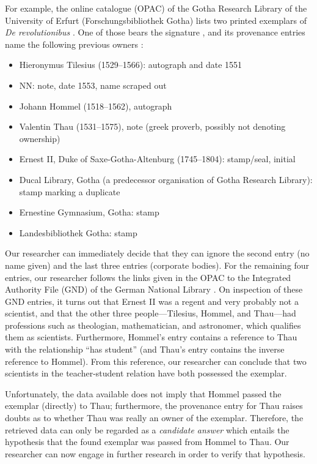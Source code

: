 For example, the online catalogue (OPAC) of the Gotha Research Library of the University of Erfurt (Forschungsbibliothek Gotha) lists two printed exemplars
of \emph{De revolutionibus} \autocite{OPACDeRev}.
One of those bears the signature , and its provenance entries name the following previous owners  \autocite{OPACDeRevPPN}:
%
\begin{itemize}
  \item
    Hieronymus Tilesius (1529–1566): autograph and date 1551
  \item
    NN: note, date 1553, name scraped out
  \item
    Johann Hommel (1518–1562), autograph
  \item
    Valentin Thau (1531–1575), note (greek proverb, possibly not denoting ownership)
  \item
    Ernest II, Duke of Saxe-Gotha-Altenburg (1745–1804): stamp/seal, initial
  \item
    Ducal Library, Gotha (a predecessor organisation of Gotha Research Library): stamp marking a duplicate
  \item
    Ernestine Gymnasium, Gotha: stamp
  \item
    Landesbibliothek Gotha: stamp
\end{itemize}
%
Our researcher can immediately decide that they can ignore the second entry (no name given) and the last three entries (corporate bodies).
For the remaining four entries, our researcher follows the links given in the OPAC to the Integrated Authority File (GND) of the German National Library \autocite{DNBCatalogue}.
On inspection of these GND entries, it turns out that Ernest II was a regent and very probably not a scientist,
and that the other three people---Tilesius, Hommel, and Thau---had professions such as theologian,
mathematician, and astronomer, which qualifies them as scientists. Furthermore, Hommel's entry
contains a reference to Thau with the relationship \enquote{has student}
(and Thau's entry contains the inverse reference to Hommel).
From this reference, our researcher can conclude that two scientists in the teacher-student relation
have both possessed the exemplar. 

Unfortunately, the data available does not imply that Hommel passed the exemplar (directly) to Thau;
furthermore, the provenance entry for Thau raises doubts as to whether Thau was really an owner of the exemplar.
Therefore, the retrieved data can only be regarded as a \emph{candidate answer}
which entails the hypothesis that the found exemplar was passed from Hommel to Thau.
Our researcher can now engage in further research in order to verify that hypothesis.

